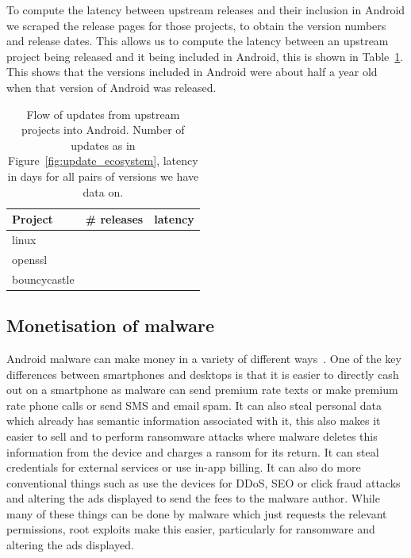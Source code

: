 \documentclass[conference,a4paper,twoside]{IEEEtran}
\let\OldTodo\todo
\renewcommand{\todo}{\OldTodo[inline]}
\newcommand{\todolater}[1]{}%
\begin{document}
To compute the latency between upstream releases and their inclusion in Android we scraped the release pages for those projects, to obtain the version numbers and release dates.
This allows us to compute the latency between an upstream project being released and it being included in Android, this is shown in Table~\ref{tab:update_ecosystem}.
This shows that the versions included in Android were about half a year old when that version of Android was released.
\begin{table}
\centering
\begin{tabular}{l|r|r}
Project	&	\# releases	&	latency \\ \hline
linux	&	\linuxNumVersions	&	\linuxMeanUpdateLatency \\
openssl	&	\opensslNumVersions	&	\opensslMeanUpdateLatency \\
bouncycastle	&	\bouncycastleNumVersions	&	\bouncycastleMeanUpdateLatency \\
\end{tabular}
\caption{Flow of updates from upstream projects into Android. Number of updates as in Figure~\ref{fig:update_ecosystem}, latency in days for all pairs of versions we have data on.\todolater{scrape the other 26 websites... is it worth it?}}
\label{tab:update_ecosystem}
\end{table}



\subsection{Monetisation of malware}
Android malware can make money in a variety of different ways~\cite{Felt2011}.
One of the key differences between smartphones and desktops is that it is easier to directly cash out on a smartphone as malware can send premium rate texts or make premium rate phone calls or send SMS and email spam.
It can also steal personal data which already has semantic information associated with it, this also makes it easier to sell and to perform ransomware attacks where malware deletes this information from the device and charges a ransom for its return.
It can steal credentials for external services or use in-app billing.
It can also do more conventional things such as use the devices for DDoS, SEO or click fraud attacks and altering the ads displayed to send the fees to the malware author.
While many of these things can be done by malware which just requests the relevant permissions, root exploits make this easier, particularly for ransomware and altering the ads displayed.
\end{document}
